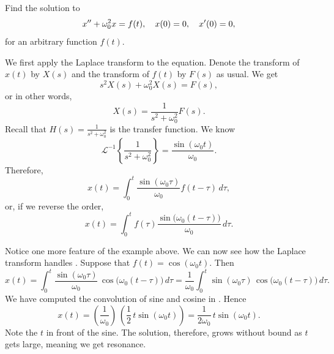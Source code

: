 \begin{example} \label{example:undampedforcedbylaplacearbitrhs}
Find the solution to
\begin{equation*}
x'' + \omega_0^2 x = f(t) , \quad x(0) = 0, \quad x'(0) = 0 ,
\avoidbreak
\end{equation*}
for an arbitrary function $f(t)$.

We first apply the Laplace transform to the equation.  Denote
the transform of $x(t)$ by $X(s)$ and the transform of $f(t)$ by
$F(s)$ as usual.  We get
\begin{equation*}
s^2 X(s) + \omega_0^2 X(s) = F(s) ,
\end{equation*}
or in other words,
\begin{equation*}
X(s) = \frac{1}{s^2+ \omega_0^2} F(s).
\end{equation*}
Recall that $H(s) = \frac{1}{s^2+ \omega_0^2}$ is the transfer function.
We know
\begin{equation*}
{\mathcal{L}}^{-1} \left\{
\frac{1}{s^2+ \omega_0^2}
\right\} = 
\frac{\sin (\omega_0 t)}{\omega_0} .
\end{equation*}
Therefore,
\begin{equation*}
x(t) = 
\int_0^t
\frac{\sin (\omega_0 \tau)}{\omega_0}
f(t-\tau) \, d\tau ,
\end{equation*}
or, if we reverse the order,
\begin{equation*}
x(t) = 
\int_0^t
f(\tau) 
\frac{\sin \bigl( \omega_0 (t-\tau) \bigr)}{\omega_0} \, d\tau .
\end{equation*}
\end{example}

Notice one more feature of the example above.
We can now see how the Laplace transform
handles .  Suppose that $f(t) =
\cos (\omega_0 t)$.  Then
\begin{equation*}
x(t) = 
\int_0^t
\frac{\sin (\omega_0 \tau)}{\omega_0} \,
\cos \bigl( \omega_0 (t-\tau) \bigr) \, d\tau
=
\frac{1}{\omega_0}
\int_0^t
\sin ( \omega_0 \tau ) \,
\cos \bigl(\omega_0 (t-\tau) \bigr) \, d\tau .
\end{equation*}
We have computed the convolution of sine and cosine in
.  Hence
\begin{equation*}
x(t) =
\left(
\frac{1}{\omega_0}
\right) \,
\left(
\frac{1}{2} \,
t
\sin ( \omega_0 t )
\right)
=
\frac{1}{2 \omega_0} \,
t
\sin ( \omega_0 t ).
\end{equation*}
Note the $t$ in front of the sine.  The solution, therefore, grows without
bound as $t$ gets large, meaning we get resonance.

